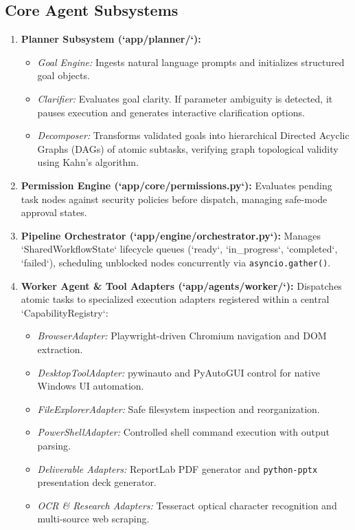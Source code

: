 \documentclass[conference]{IEEEtran}
\begin{document}
\subsection{Core Agent Subsystems}
\begin{enumerate}
    \item \textbf{Planner Subsystem (`app/planner/`):}
    \begin{itemize}
        \item \textit{Goal Engine:} Ingests natural language prompts and initializes structured goal objects.
        \item \textit{Clarifier:} Evaluates goal clarity. If parameter ambiguity is detected, it pauses execution and generates interactive clarification options.
        \item \textit{Decomposer:} Transforms validated goals into hierarchical Directed Acyclic Graphs (DAGs) of atomic subtasks, verifying graph topological validity using Kahn's algorithm.
    \end{itemize}

    \item \textbf{Permission Engine (`app/core/permissions.py`):} Evaluates pending task nodes against security policies before dispatch, managing safe-mode approval states.

    \item \textbf{Pipeline Orchestrator (`app/engine/orchestrator.py`):} Manages `SharedWorkflowState` lifecycle queues (`ready`, `in_progress`, `completed`, `failed`), scheduling unblocked nodes concurrently via \texttt{asyncio.gather()}.

    \item \textbf{Worker Agent \& Tool Adapters (`app/agents/worker/`):} Dispatches atomic tasks to specialized execution adapters registered within a central `CapabilityRegistry`:
    \begin{itemize}
        \item \textit{BrowserAdapter:} Playwright-driven Chromium navigation and DOM extraction.
        \item \textit{DesktopToolAdapter:} pywinauto and PyAutoGUI control for native Windows UI automation.
        \item \textit{FileExplorerAdapter:} Safe filesystem inspection and reorganization.
        \item \textit{PowerShellAdapter:} Controlled shell command execution with output parsing.
        \item \textit{Deliverable Adapters:} ReportLab PDF generator and \texttt{python-pptx} presentation deck generator.
        \item \textit{OCR \& Research Adapters:} Tesseract optical character recognition and multi-source web scraping.
    \end{itemize}


\end{enumerate}
\end{document}
